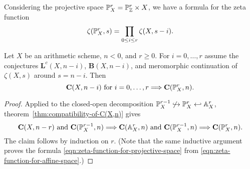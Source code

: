 \documentclass{article}
\numberwithin{equation}{section}
\begin{document}
Considering the projective space $\mathbb{P}_X^r = \mathbb{P}_{\mathbb{Z}}^r \times X$,
we have a formula for the zeta function
\begin{equation}
  \label{eqn:zeta-function-for-projective-space}
  \zeta (\mathbb{P}_X^r, s) = \prod_{0 \le i \le r} \zeta (X, s-i).
\end{equation}

\begin{corollary}
  Let $X$ be an arithmetic scheme, $n < 0$, and $r \ge 0$.
  For $i = 0,\ldots,r$ assume the conjectures $\mathbf{L}^c (X,n-i)$,
  $\mathbf{B} (X,n-i)$, and meromorphic continuation of $\zeta (X,s)$ around
  $s = n-i$. Then
  \[ \mathbf{C} (X,n-i)\text{ for }i = 0,\ldots,r \Longrightarrow
    \mathbf{C} (\mathbb{P}_X^r, n). \]

  \begin{proof}
    Applied to the closed-open decomposition
    $\mathbb{P}_X^{r-1} \not\hookrightarrow \mathbb{P}_X^r \hookleftarrow \mathbb{A}_X^r$,
    theorem~\ref{thm:compatibility-of-C(X,n)} gives
    \[ \mathbf{C} (X, n-r) \text{ and } \mathbf{C} (\mathbb{P}_X^{r-1}, n)
      \Longrightarrow
      \mathbf{C} (\mathbb{A}_X^r, n) \text{ and } \mathbf{C} (\mathbb{P}_X^{r-1}, n)
      \Longrightarrow
      \mathbf{C} (\mathbb{P}_X^r,n). \]
    The claim follows by induction on $r$.
    (Note that the same inductive argument proves the formula
    \eqref{eqn:zeta-function-for-projective-space} from
    \eqref{eqn:zeta-function-for-affine-space}.)
    \end{proof}
\end{corollary}


\pagebreak
\end{document}
